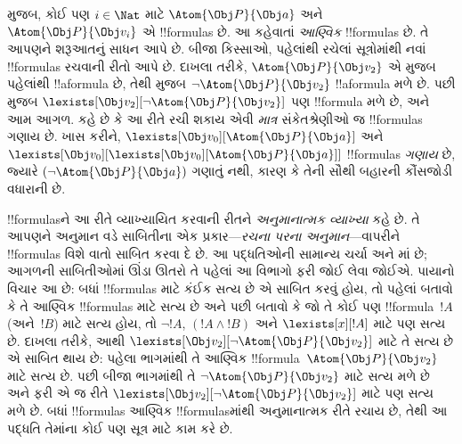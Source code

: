 \documentclass[../../../include/open-logic-section]{subfiles}
\begin{document}
 મુજબ, કોઈ પણ $i \in \Nat$ માટે $\Atom{\Obj P}{\Obj
a}$ અને $\Atom{\Obj P}{\Obj v_i}$ એ !!{formula}s છે. આ કહેવાતાં
\emph{આણ્વિક} !!{formula}s છે. તે આપણને શરૂઆતનું સાધન આપે છે. બીજા
કિસ્સાઓ, પહેલાંથી રચેલાં સૂત્રોમાંથી નવાં !!{formula}s રચવાની
રીતો આપે છે. દાખલા તરીકે, $\Atom{\Obj P}{\Obj v_2}$ એ
 મુજબ પહેલાંથી !!a{formula} છે, તેથી
 મુજબ $\lnot \Atom{\Obj P}{\Obj v_2}$ !!a{formula}
મળે છે. પછી  મુજબ $\lexists[\Obj v_2][\lnot
\Atom{\Obj P}{\Obj v_2}]$ પણ !!{formula} મળે છે, અને આમ આગળ.
 કહે છે કે આ રીતે રચી શકાય એવી \emph{માત્ર}
સંકેતશ્રેણીઓ જ !!{formula}s ગણાય છે. ખાસ કરીને,
$\lexists[\Obj v_0][\Atom{\Obj P}{\Obj a}]$ અને $\lexists[\Obj
v_0][\lexists[\Obj v_0][\Atom{\Obj P}{\Obj a}]]$ !!{formula}s
\emph{ગણાય} છે, જ્યારે $(\lnot \Atom{\Obj P}{\Obj a})$ ગણાતું નથી,
કારણ કે તેની સૌથી બહારની કૌંસજોડી વધારાની છે.

!!{formula}sને આ રીતે વ્યાખ્યાયિત કરવાની રીતને \emph{અનુમાનાત્મક
વ્યાખ્યા} કહે છે. તે આપણને અનુમાન વડે સાબિતીના એક પ્રકાર---\emph{રચના
પરના અનુમાન}---વાપરીને !!{formula}s વિશે વાતો સાબિત કરવા દે છે.
આ પદ્ધતિઓની સામાન્ય ચર્ચા  અને
માં છે; આગળની સાબિતીઓમાં ઊંડા ઊતરો તે પહેલાં
આ વિભાગો ફરી જોઈ લેવા જોઈએ. પાયાનો વિચાર આ છે: બધાં !!{formula}s માટે
કંઈક સત્ય છે એ સાબિત કરવું હોય, તો પહેલાં બતાવો કે તે આણ્વિક
!!{formula}s માટે સત્ય છે અને પછી બતાવો કે જો તે કોઈ પણ
!!{formula}~$!A$ (અને~$!B$) માટે સત્ય હોય, તો $\lnot !A$, $(!A \land
!B)$ અને $\lexists[x][!A]$ માટે પણ સત્ય છે. દાખલા તરીકે, આથી
$\lexists[\Obj v_2][\lnot \Atom{\Obj P}{\Obj v_2}]$ માટે તે સત્ય છે
એ સાબિત થાય છે: પહેલા ભાગમાંથી તે આણ્વિક !!{formula}~$\Atom{\Obj
P}{\Obj v_2}$ માટે સત્ય છે. પછી બીજા ભાગમાંથી તે $\lnot \Atom{\Obj
P}{\Obj v_2}$ માટે સત્ય મળે છે અને ફરી એ જ રીતે
$\lexists[\Obj v_2][\lnot \Atom{\Obj P}{\Obj v_2}]$ માટે પણ સત્ય મળે
છે. બધાં !!{formula}s આણ્વિક !!{formula}sમાંથી અનુમાનાત્મક રીતે રચાય
છે, તેથી આ પદ્ધતિ તેમાંના કોઈ પણ સૂત્ર માટે કામ કરે છે.
\end{document}
